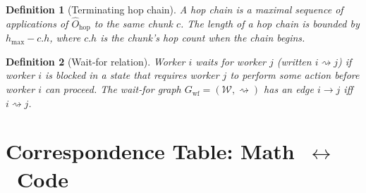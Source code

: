 \documentclass[11pt,a4paper]{report}
\newtheorem{definition}{Definition}[section]
\begin{document}
\begin{definition}[Terminating hop chain]
\label{def:hop-chain}
A \emph{hop chain} is a maximal sequence of applications of
$\hat{O}_{\text{hop}}$ to the same chunk $c$.  The length of a hop
chain is bounded by $h_{\max} - c.h$, where $c.h$ is the chunk's
hop count when the chain begins.
\end{definition}

\begin{definition}[Wait-for relation]
\label{def:waitfor}
Worker $i$ \emph{waits for} worker $j$ (written $i \rightsquigarrow j$)
if worker $i$ is blocked in a state that requires worker $j$ to
perform some action before worker $i$ can proceed.  The
\emph{wait-for graph} $G_{\text{wf}} = (\mathcal{W}, \rightsquigarrow)$
has an edge $i \to j$ iff $i \rightsquigarrow j$.
\end{definition}

\newpage

\section{Correspondence Table: Math~$\leftrightarrow$~Code}
\label{sec:corr}
\end{document}
